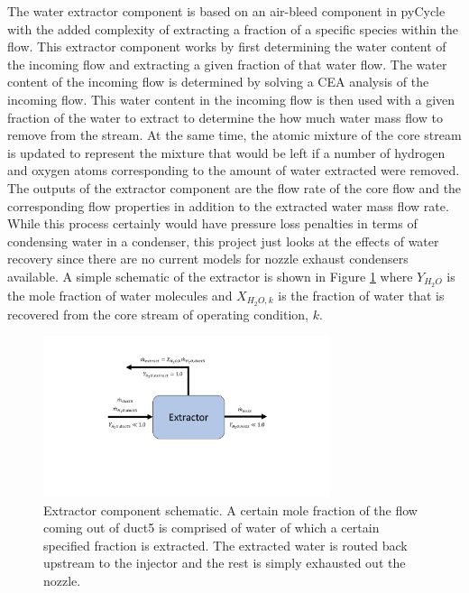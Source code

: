 \documentclass[conf]{new-aiaa}
\begin{document}
The water extractor component is based on an air-bleed component in pyCycle with the added complexity of extracting a fraction of a specific species within the flow.
This extractor component works by first determining the water content of the incoming flow and extracting a given fraction of that water flow.
The water content of the incoming flow is determined by solving a CEA analysis of the incoming flow.
This water content in the incoming flow is then used with a given fraction of the water to extract to determine the how much water mass flow to remove from the stream.
At the same time, the atomic mixture of the core stream is updated to represent the mixture that would be left if a number of hydrogen and oxygen atoms corresponding to the amount of water extracted were removed.
The outputs of the extractor component are the flow rate of the core flow and the corresponding flow properties in addition to the extracted water mass flow rate.
While this process certainly would have pressure loss penalties in terms of condensing water in a condenser, this project just looks at the effects of water recovery since there are no current models for nozzle exhaust condensers available.
A simple schematic of the extractor is shown in Figure \ref{fig:extractor} where $Y_{H_2O}$ is the mole fraction of water molecules and $X_{H_2O,k}$ is the fraction of water that is recovered from the core stream of operating condition, $k$.

\begin{figure}[hbt!]
    \centering
    \includegraphics[width=0.75\textwidth]{extractor.pdf}
    \caption{
        Extractor component schematic.
        A certain mole fraction of the flow coming out of duct5 is comprised of water of which a certain specified fraction is extracted.
        The extracted water is routed back upstream to the injector and the rest is simply exhausted out the nozzle.
    }
    \label{fig:extractor}
\end{figure}
\end{document}

